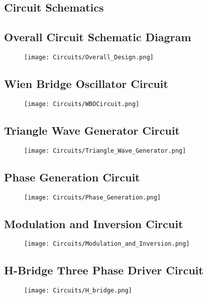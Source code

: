 \documentclass[12pt]{article}
\begin{document}
\begin{appendices}%
\pagebreak

\section{Circuit Schematics} %

\subsection{Overall Circuit Schematic Diagram}%
\begin{figure}[H]
\centering
\texttt{[image: Circuits/Overall\_Design.png]}
\label{Overall_Design}
\end{figure}
\subsection{Wien Bridge Oscillator Circuit}%
\begin{figure}[H]
\centering
\texttt{[image: Circuits/WBOCircuit.png]}
\label{Overall_Design_V1}
\end{figure}
\subsection{Triangle Wave Generator Circuit}%
\begin{figure}[H]
\centering
\texttt{[image: Circuits/Triangle\_Wave\_Generator.png]}
\label{Overall_Design_V1}
\end{figure}
\subsection{Phase Generation Circuit}%
\begin{figure}[H]
\centering
\texttt{[image: Circuits/Phase\_Generation.png]}
\label{Overall_Design_V1}
\end{figure}
\subsection{Modulation and Inversion Circuit}%
\begin{figure}[H]
\centering
\texttt{[image: Circuits/Modulation\_and\_Inversion.png]}
\label{Overall_Design_V1}
\end{figure}
\subsection{H-Bridge Three Phase Driver Circuit}%
\begin{figure}[H]
\centering
\texttt{[image: Circuits/H\_bridge.png]}
\label{Overall_Design_V1}
\end{figure}


\end{appendices}
\end{document}
